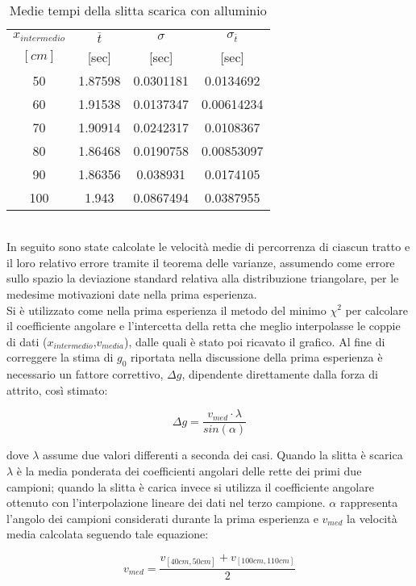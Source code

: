 \documentclass[a4paper,11pt,oneside]{article}
\begin{document}
\begin{table}[h!]
\centering
\begin{tabular}{c|ccc}
\toprule
$x_{intermedio}$&$\overline{t}$&$\sigma$&$\sigma_{\overline{t}}$\\
$[\si{cm}]$&[sec]&[sec]&[sec]\\
\midrule
50	&1.87598	&0.0301181	&0.0134692\\
60	&1.91538	&0.0137347	&0.00614234\\
70	&1.90914	&0.0242317	&0.0108367\\
80	&1.86468	&0.0190758	&0.00853097\\
90	&1.86356	&0.038931	&0.0174105\\
100	&1.943	    &0.0867494	&0.0387955\\
\bottomrule
\end{tabular}
    \caption{Medie tempi della slitta scarica con alluminio}
    \label{tab:nm_sa}
\end{table}
\\
In seguito sono state calcolate le velocità medie di percorrenza di ciascun tratto e il loro relativo errore tramite il teorema delle varianze, assumendo come errore sullo spazio la deviazione standard relativa alla distribuzione triangolare, per le medesime motivazioni date nella prima esperienza.\\
Si è utilizzato come nella prima esperienza il metodo del minimo $\chi^2$ per calcolare il coefficiente angolare e l'intercetta della retta che meglio interpolasse le coppie di dati ($x_{intermedio}$,$v_{media}$), dalle quali è stato poi ricavato il grafico. Al fine di correggere la stima di $g_0$ riportata nella discussione della prima esperienza è necessario un fattore correttivo, $\Delta g$, dipendente direttamente dalla forza di attrito, così stimato:

\begin{equation*}
   \Delta g=\frac{v_{med}\cdot \lambda}{sin(\alpha)}
\end{equation*}


dove $\lambda$ assume due valori differenti a seconda dei casi. Quando la slitta è scarica $\lambda$ è la media ponderata dei coefficienti angolari delle rette dei primi due campioni; quando la slitta è carica invece si utilizza il coefficiente angolare ottenuto con l'interpolazione lineare dei dati nel terzo campione. $\alpha$ rappresenta l'angolo dei campioni considerati durante la prima esperienza e $v_{med}$ la velocità media calcolata seguendo tale equazione:

\begin{equation*}
    v_{med}=\frac{v_{[40cm, 50cm]}+v_{[100cm, 110cm]}}{2}
\end{equation*}
\end{document}
